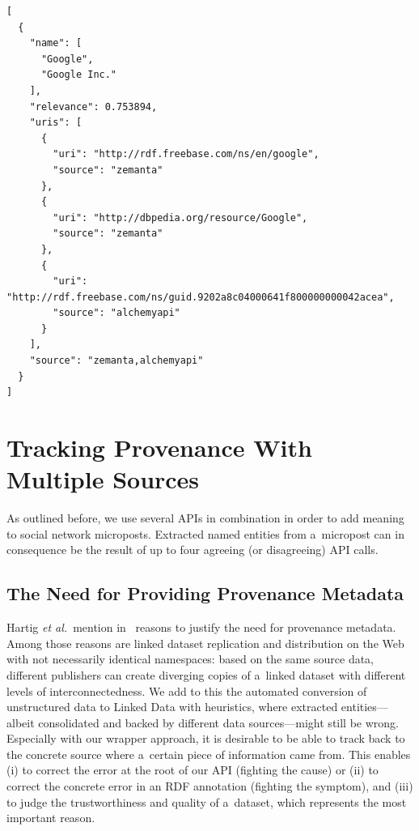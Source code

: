 \newpage

\begin{lstlisting}[caption={
   [Consolidated output of two named-entity recognition APIs]
   {Consolidated output of two named-entity recognition APIs,
    namely Zemanta and AlchemyAPI.}
  },
  label={code:googlecombined}]
[
  {
    "name": [
      "Google",
      "Google Inc."
    ],
    "relevance": 0.753894,
    "uris": [
      {
        "uri": "http://rdf.freebase.com/ns/en/google",
        "source": "zemanta"
      },
      {
        "uri": "http://dbpedia.org/resource/Google",
        "source": "zemanta"
      },
      {
        "uri": "http://rdf.freebase.com/ns/guid.9202a8c04000641f800000000042acea",
        "source": "alchemyapi"
      }
    ],
    "source": "zemanta,alchemyapi"
  }
]
\end{lstlisting}

\section{Tracking Provenance With Multiple Sources}                    \label{sec:tracking}

As outlined before, we use several APIs in combination
in order to add meaning to social network microposts.
Extracted named entities from a~micropost can in consequence
be the result of up to four agreeing (or disagreeing) API calls.

\subsection{The Need for Providing Provenance Metadata}

Hartig \emph{et al.}\ mention in~\cite{hartig2010provenance}
reasons to justify the need for provenance metadata.
Among those reasons are linked dataset replication and distribution
on the Web with not necessarily identical namespaces:
based on the same source data, different publishers can
create diverging copies of a~linked dataset
with different levels of interconnectedness.
We add to this the automated conversion of unstructured data
to Linked Data with heuristics,
where extracted entities---albeit consolidated
and backed by different data sources---might still be wrong.
Especially with our wrapper approach,
it is desirable to be able to track back to the concrete source
where a~certain piece of information came from.
This enables
(i) to correct the error at the root of our API
(fighting the cause) or
(ii) to correct the concrete error in an RDF annotation
(fighting the symptom), and
(iii) to judge the trustworthiness and quality of a~dataset,
which represents the most important reason.

